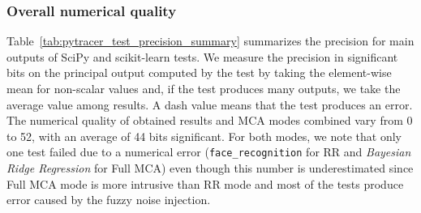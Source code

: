 \documentclass[11pt]{article}
\begin{document}
\subsubsection{Overall numerical quality}

Table~\ref{tab:pytracer_test_precision_summary} summarizes the precision for main outputs of SciPy and scikit-learn tests. 
We measure the precision in significant bits on the principal output computed by the test by taking the element-wise mean for non-scalar values and, if the test produces many outputs, we take the average value among results. A dash value means that the test produces an error. The numerical quality of obtained results and MCA modes combined vary from 0 to 52, with an average of 44 bits significant. For both modes, we note that only one test failed due to a numerical error (\texttt{face\_recognition} for RR and \textit{Bayesian Ridge Regression} for Full MCA) even though this number is underestimated since Full MCA mode is more intrusive than RR mode and most of the tests produce error caused by the fuzzy noise injection. 
\end{document}
